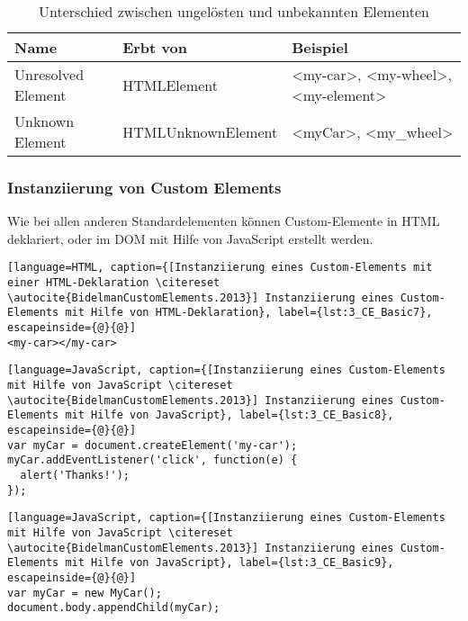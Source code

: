 \begin{table}[htbp]
\centering
\begin{tabular}{ M{3cm} | M{5cm} | M{5cm} }
Name & Erbt von & Beispiel \\
\hline
\hline
Unresolved Element & HTMLElement & <my-car>, <my-wheel>, <my-element>\\
\hline
Unknown Element & HTMLUnknownElement & <myCar>, <my\_wheel>\\
\end{tabular}
\caption[
Unterschied zwischen ungelösten und unbekannten Elementen \citereset \autocite{BidelmanCustomElements.2013}
]
{Unterschied zwischen ungelösten und unbekannten Elementen}
\label{tab:Unterschiede_Elemente}
\end{table}

\subsubsection{Instanziierung von Custom Elements}

Wie bei allen anderen Standardelementen können Custom-Elemente in HTML deklariert, oder im DOM mit Hilfe von JavaScript erstellt werden.

\begin{enumerate}
\begin{lstlisting}[language=HTML, caption={[Instanziierung eines Custom-Elements mit einer HTML-Deklaration \citereset \autocite{BidelmanCustomElements.2013}] Instanziierung eines Custom-Elements mit Hilfe von HTML-Deklaration}, label={lst:3_CE_Basic7}, escapeinside={@}{@}]
<my-car></my-car>
\end{lstlisting}

\begin{lstlisting}[language=JavaScript, caption={[Instanziierung eines Custom-Elements mit Hilfe von JavaScript \citereset \autocite{BidelmanCustomElements.2013}] Instanziierung eines Custom-Elements mit Hilfe von JavaScript}, label={lst:3_CE_Basic8}, escapeinside={@}{@}]
var myCar = document.createElement('my-car');
myCar.addEventListener('click', function(e) {
  alert('Thanks!');
});
\end{lstlisting}

\begin{lstlisting}[language=JavaScript, caption={[Instanziierung eines Custom-Elements mit Hilfe von JavaScript \citereset \autocite{BidelmanCustomElements.2013}] Instanziierung eines Custom-Elements mit Hilfe von JavaScript}, label={lst:3_CE_Basic9}, escapeinside={@}{@}]
var myCar = new MyCar();
document.body.appendChild(myCar);
\end{lstlisting}
\end{enumerate}


